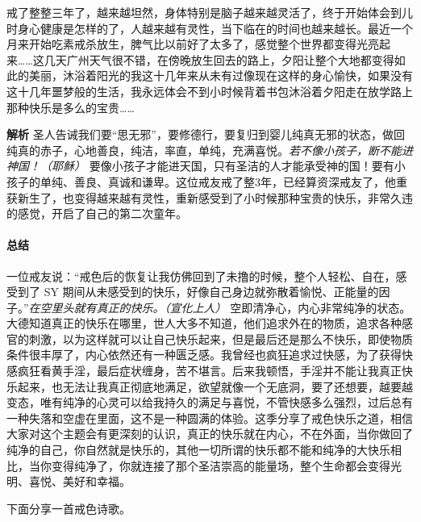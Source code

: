 \begin{case}
    戒了整整三年了，越来越坦然，身体特别是脑子越来越灵活了，终于开始体会到儿时身心健康是怎样的了，人越来越有灵性，当下临在的时间也越来越长。最近一个月来开始吃素戒杀放生，脾气比以前好了太多了，感觉整个世界都变得光亮起来……这几天广州天气很不错，在傍晚放生回去的路上，夕阳让整个大地都变得如此的美丽，沐浴着阳光的我这十几年来从未有过像现在这样的身心愉快，如果没有这十几年噩梦般的生活，我永远体会不到小时候背着书包沐浴着夕阳走在放学路上那种快乐是多么的宝贵……

    \textbf{解析} 圣人告诫我们要“思无邪”，要修德行，要复归到婴儿纯真无邪的状态，做回纯真的赤子，心地善良，纯洁，率直，单纯，充满喜悦。\textit{若不像小孩子，断不能进神国！（耶稣）} 要像小孩子才能进天国，只有圣洁的人才能承受神的国！要有小孩子的单纯、善良、真诚和谦卑。这位戒友戒了整3年，已经算资深戒友了，他重获新生了，也变得越来越有灵性，重新感受到了小时候那种宝贵的快乐，非常久违的感觉，开启了自己的第二次童年。
\end{case}

\paragraph*{总结}

一位戒友说：“戒色后的恢复让我仿佛回到了未撸的时候，整个人轻松、自在，感受到了 SY 期间从未感受到的快乐，好像自己身边就弥散着愉悦、正能量的因子。”\textit{在空里头就有真正的快乐。（宣化上人）} 空即清净心，内心非常纯净的状态。大德知道真正的快乐在哪里，世人大多不知道，他们追求外在的物质，追求各种感官的刺激，以为这样就可以让自己快乐起来，但是最后还是那么不快乐，即使物质条件很丰厚了，内心依然还有一种匮乏感。我曾经也疯狂追求过快感，为了获得快感疯狂看黄手淫，最后症状缠身，苦不堪言。后来我顿悟，手淫并不能让我真正快乐起来，也无法让我真正彻底地满足，欲望就像一个无底洞，要了还想要，越要越变态，唯有纯净的心灵可以给我持久的满足与喜悦，不管快感多么强烈，过后总有一种失落和空虚在里面，这不是一种圆满的体验。这季分享了戒色快乐之道，相信大家对这个主题会有更深刻的认识，真正的快乐就在内心，不在外面，当你做回了纯净的自己，你自然就是快乐的，其他一切所谓的快乐都不能和纯净的大快乐相比，当你变得纯净了，你就连接了那个圣洁崇高的能量场，整个生命都会变得光明、喜悦、美好和幸福。

下面分享一首戒色诗歌。


